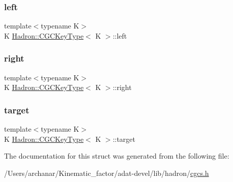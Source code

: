 \subsubsection{\texorpdfstring{left}{left}}
{\footnotesize\ttfamily template$<$typename K$>$ \\
K \mbox{\hyperlink{structHadron_1_1CGCKeyType}{Hadron\+::\+C\+G\+C\+Key\+Type}}$<$ K $>$\+::left}

\mbox{\label{structHadron_1_1CGCKeyType_a4d75dc8807294fd99260f8ac1baedee3}} 
\subsubsection{\texorpdfstring{right}{right}}
{\footnotesize\ttfamily template$<$typename K$>$ \\
K \mbox{\hyperlink{structHadron_1_1CGCKeyType}{Hadron\+::\+C\+G\+C\+Key\+Type}}$<$ K $>$\+::right}

\mbox{\label{structHadron_1_1CGCKeyType_a6e142be2aca9c37be703a19a06c31700}} 
\subsubsection{\texorpdfstring{target}{target}}
{\footnotesize\ttfamily template$<$typename K$>$ \\
K \mbox{\hyperlink{structHadron_1_1CGCKeyType}{Hadron\+::\+C\+G\+C\+Key\+Type}}$<$ K $>$\+::target}



The documentation for this struct was generated from the following file\+:\begin{DoxyCompactItemize}
\item 
/\+Users/archanar/\+Kinematic\+\_\+factor/adat-\/devel/lib/hadron/\mbox{\hyperlink{adat-devel_2lib_2hadron_2cgcs_8h}{cgcs.\+h}}\end{DoxyCompactItemize}
